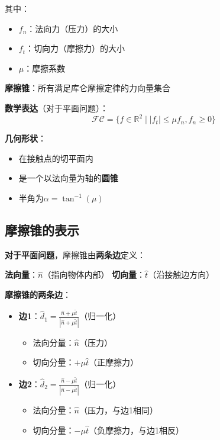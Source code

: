\documentclass[12pt,a4paper]{article}
\begin{document}
其中：
\begin{itemize}
\item $f_n$：法向力（压力）的大小
\item $f_t$：切向力（摩擦力）的大小
\item $\mu$：摩擦系数
\end{itemize}

\textbf{摩擦锥}：所有满足库仑摩擦定律的力向量集合

\textbf{数学表达}（对于平面问题）：
\begin{equation}
\mathcal{FC} = \{f \in \mathbb{R}^2 \mid |f_t| \leq \mu f_n, f_n \geq 0\}
\end{equation}

\textbf{几何形状}：
\begin{itemize}
\item 在接触点的切平面内
\item 是一个以法向量为轴的\textbf{圆锥}
\item 半角为$\alpha = \tan^{-1}(\mu)$
\end{itemize}

\subsection{摩擦锥的表示}

\textbf{对于平面问题}，摩擦锥由\textbf{两条边}定义：

\textbf{法向量}：$\hat{n}$（指向物体内部）
\textbf{切向量}：$\hat{t}$（沿接触边方向）

\textbf{摩擦锥的两条边}：
\begin{itemize}
\item \textbf{边1}：$\hat{d}_1 = \frac{\hat{n} + \mu \hat{t}}{|\hat{n} + \mu \hat{t}|}$（归一化）
   \begin{itemize}
   \item 法向分量：$\hat{n}$（压力）
   \item 切向分量：$+\mu \hat{t}$（正摩擦力）
   \end{itemize}

\item \textbf{边2}：$\hat{d}_2 = \frac{\hat{n} - \mu \hat{t}}{|\hat{n} - \mu \hat{t}|}$（归一化）
   \begin{itemize}
   \item 法向分量：$\hat{n}$（压力，与边1相同）
   \item 切向分量：$-\mu \hat{t}$（负摩擦力，与边1相反）
   \end{itemize}
\end{itemize}
\end{document}
